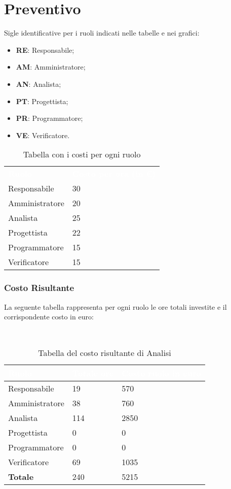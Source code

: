 \section{Preventivo}
Sigle identificative per i ruoli indicati nelle tabelle e nei grafici:
\begin{itemize}
    \item \textbf{RE}: Responsabile;
    \item \textbf{AM}: Amministratore;
    \item \textbf{AN}: Analista;
    \item \textbf{PT}: Progettista;
    \item \textbf{PR}: Programmatore;
    \item \textbf{VE}: Verificatore.
\end{itemize}

{	
\renewcommand{\arraystretch}{2}
\centering
\begin{longtable}[h!]{ C{3cm} C{4cm}}
\caption{Tabella con i costi per ogni ruolo}\\

\textcolor{white}{\textbf{Ruolo}} & \textcolor{white}{\textbf{Costo per ora (in \euro{})}}\\

Responsabile   & 30 \\
Amministratore & 20 \\
Analista       & 25 \\
Progettista    & 22 \\
Programmatore  & 15 \\
Verificatore   & 15 \\
\end{longtable}
}

\clearpage

\subsubsection{Costo Risultante}
La seguente tabella rappresenta per ogni ruolo le ore totali investite e il corrispondente costo in euro:
{
\renewcommand{\arraystretch}{2}
\centering
\
\begin{longtable}{ C{3cm} C{2cm} C{4cm}}
\caption{Tabella del costo risultante di Analisi}\\
	\textcolor{white}{\textbf{Ruolo}} & 
	\textcolor{white}{\textbf{Totale ore}} & 
	\textcolor{white}{\textbf{Costo ruolo in euro}}\\	
\endhead

        Responsabile & 19 & 570\\
        Amministratore & 38 & 760\\
        Analista & 114 & 2850 \\
        Progettista & 0 & 0 \\
        Programmatore & 0 & 0 \\
        Verificatore & 69 & 1035 \\
        \textbf{Totale} & 240 & 5215 \\
		
	\end{longtable}

}


